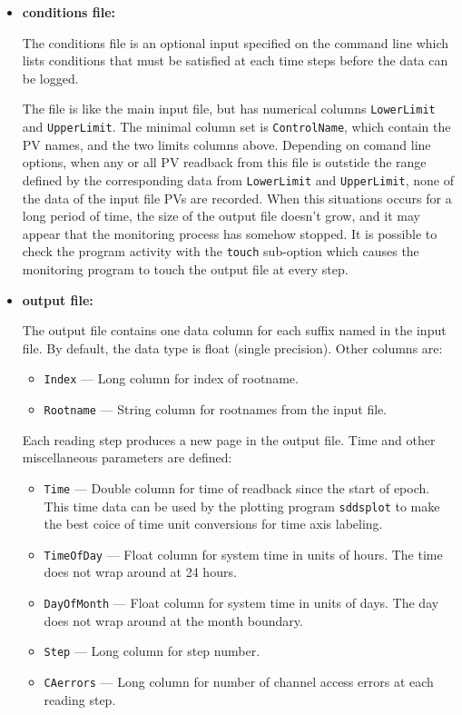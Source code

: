 \begin{itemize}
\begin{itemize}
\item {\bf conditions file:} \par
The conditions file is an optional input specified on the command line which lists
conditions that must be satisfied at each time steps before the data can be logged.

The file is like the main input file, but has numerical columns \verb+LowerLimit+ and \verb+UpperLimit+.
The minimal column set is \verb+ControlName+, which contain the PV names, and the two limits columns above.
Depending on comand line options, when any or all PV readback from this file
is outstide the range defined by the corresponding data from \verb+LowerLimit+ and \verb+UpperLimit+,
none of the data of the input file PVs are recorded. 
When this situations occurs for a long period of time, the size of the output file doesn't
grow, and it may appear that the monitoring process has somehow stopped.
It is possible to check the program activity with the \verb+touch+ sub-option
which causes the monitoring program to touch the output file at every step.

\item {\bf output file:}\par
The output file contains one data column for each suffix named in the input file. By default,
the data type is float (single precision). Other columns are:
\begin{itemize}
        \item {\tt Index} --- Long column for index of rootname.
        \item {\tt Rootname} --- String column for rootnames from the input file.
\end{itemize}
Each reading step produces a new page in the output file.
Time and other miscellaneous parameters are defined: 
\begin{itemize}
        \item {\tt Time} --- Double column for time of readback since the start of epoch. This time data can be used by
        the plotting program {\verb+sddsplot+} to make the best coice of time unit conversions
        for time axis labeling.
        \item {\tt TimeOfDay} --- Float column for system time in units of hours. The time does not wrap around at 24 hours.
        \item {\tt DayOfMonth} --- Float column for system time in units of days. The day does not wrap around at the month boundary.
        \item {\tt Step} --- Long column for step number.
        \item {\tt CAerrors} --- Long column for number of channel access errors at each reading step. 
\end{itemize}


\end{itemize}
\end{itemize}
